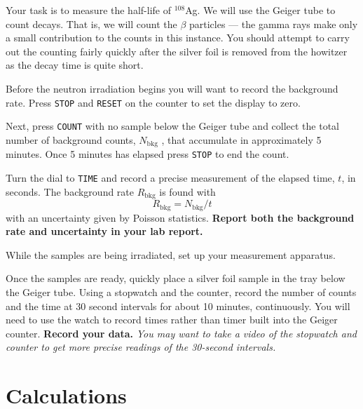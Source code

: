 Your task is to measure the half-life of $^{108}$Ag. We will use the Geiger tube to count
decays. That is, we will count the $\beta$ particles --- the gamma rays make only a small
contribution to the counts in this instance. You should attempt to carry out the counting
fairly quickly after the silver foil is removed from the howitzer as the decay time is quite
short.

\begin{steps}
	\item Before the neutron irradiation begins you will want to record the background rate. Press
\texttt{STOP} and \texttt{RESET} on the counter to set the display to zero.

	\item Next, press \texttt{COUNT} with no
sample below the Geiger tube and collect the total number of background counts, $N_\textrm{bkg}$ ,
that accumulate in approximately 5 minutes. Once 5 minutes has elapsed press \texttt{STOP} to
end the count.

	\item Turn the dial to \texttt{TIME} and record a precise measurement of the elapsed
time, $t$, in seconds. The background rate $R_\textrm{bkg}$ is found with
\begin{equation}
R_\textrm{bkg} = N_\textrm{bkg} /t
\end{equation}
with an uncertainty given by Poisson statistics. \textbf{Report both the background rate and uncertainty in your lab report.}

	\item While the samples are being irradiated, set up your measurement apparatus.

	\item Once the samples are ready, quickly place a silver foil sample in the tray below the Geiger tube. Using a stopwatch and the counter, record the number of counts and the time at 30 second intervals for about 10 minutes, continuously.%
You will need to use the watch to record times rather
than timer built into the Geiger counter. \textbf{Record your data.} \textit{You may want to take a video of the stopwatch and counter to get more precise readings of the 30-second intervals.}
\end{steps}


\section{Calculations}

